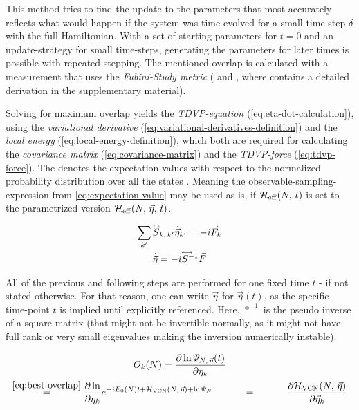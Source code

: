 This method tries to find the update to the parameters that most accurately reflects what would happen if the system was time-evolved for a small time-step $\delta$ with the full Hamiltonian.
With a set of starting parameters for $t=0$ and an update-strategy for small time-steps, generating the parameters for later times is possible with repeated stepping.
The mentioned overlap is calculated with a measurement that uses the \emph{Fubini-Study metric} (\cite{variationalClassicalNetworksPaper} and \cite{probabilitySamplingRequirementVCN}, where \cite{probabilitySamplingRequirementVCN} contains a detailed derivation in the supplementary material).

Solving for maximum overlap yields the \emph{TDVP-equation} (\autoref{eq:eta-dot-calculation}), using the \emph{variational derivative} (\autoref{eq:variational-derivatives-definition}) and the \emph{local energy} (\autoref{eq:local-energy-definition}), which both are required for calculating the \emph{covariance matrix} (\autoref{eq:covariance-matrix}) and the \emph{TDVP-force} (\autoref{eq:tdvp-force}).
The \etaExpectationVal{\ast} denotes the expectation values with respect to the normalized probability distribution over all the states  \cite{probabilitySamplingRequirementVCN}.
Meaning the observable-sampling-expression from \autoref{eq:expectation-value} may be used as-is, if $\HeffOft$ is set to the parametrized version $\HeffOft[N,\,\vec{\eta}]$.

\begin{equation}
    \label{eq:eta-dot-calculation}
    \begin{gathered}
        \lsum[k'] \matvec{S}_{k,\, k'} \dot{\vec{\eta}}_{k'} = -i \vec{F}_k\\
        \dot{\vec{\eta}} = -i {\matvec{S^{-1}}} \vec{F}
    \end{gathered}
\end{equation}

All of the previous and following steps are performed for one fixed time $t$ - if not stated otherwise.
For that reason, one can write $\vec{\eta}$ for $\vec{\eta}(t)$, as the specific time-point $t$ is implied until explicitly referenced.
Here, $\ast^{-1}$ is the pseudo inverse of a square matrix (that might not be invertible normally, as it might not have full rank or very small eigenvalues making the inversion numerically instable).

\begin{equation}
    \label{eq:variational-derivatives-definition}
    \begin{gathered}
        O_{k}(N) = \frac{\partial \ln \psiEta{N,\,\vec{\eta}}{t}}{\partial \eta_k}\\
        \stackrel{\ref{eq:best-overlap}}{=} \frac{\partial \ln }{\partial \eta_k} e^{-i E_0(N) t + \Hvcn{\vec{\eta}} + \ln \psiN} 
        \stackrel{\phantom{\ref{eq:best-overlap}}}{=} 
        \frac{\partial \Hvcn{\vec{\eta}} }{\partial \vec{\eta}_k} 
    \end{gathered}
\end{equation}

